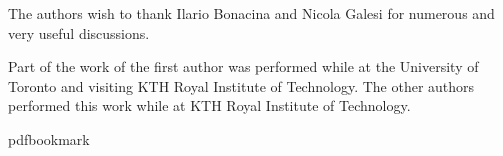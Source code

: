 \documentclass[11pt]{article}
\numberwithin{equation}{section}
\theoremstyle{definition}
\theoremstyle{plain}
\theoremstyle{plain}
\theoremstyle{definition}
\newcommand{\theauthorYF}{the first author\xspace}
\begin{document}
The authors wish to thank Ilario Bonacina and Nicola Galesi
for numerous and very useful discussions.

Part of the work of \theauthorYF was performed while at the University
of Toronto and visiting KTH Royal Institute of Technology.
%
The other authors performed this work while at KTH Royal Institute of
Technology.
 

\newcommand{\prelim}{Preliminary version in\ }\newcommand{\prelims}{Preliminary
  versions in\ }
\providecommand{\bibhead}[1]{}
\expandafter\ifx\csname pdfbookmark\endcsname\relax%
  \providecommand{\tocrefpdfbookmark}{}
\else\providecommand{\tocrefpdfbookmark}{%
   \hypertarget{tocreferences}{}%
   \pdfbookmark[1]{References}{tocreferences}}%
\fi
\end{document}
